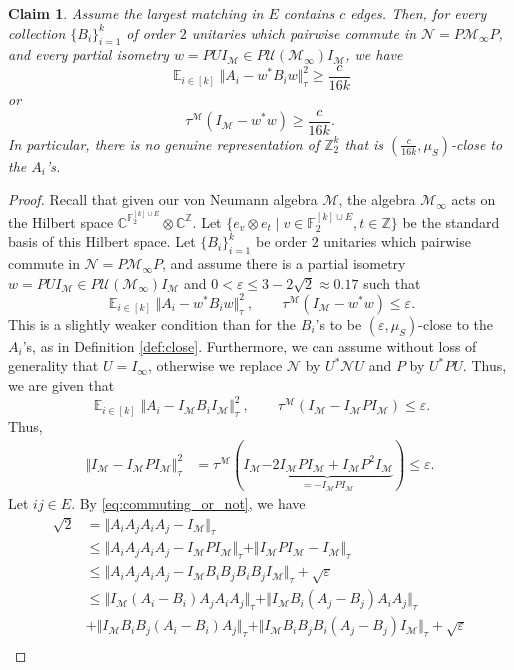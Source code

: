 \documentclass[11pt]{article}
\newtheorem{claim}[theorem]{Claim}
\theoremstyle{definition}
\newcommand{\Id}{\ensuremath{I}}
\DeclareMathOperator*{\Expectation}{\mathbb{E}}
\newcommand{\field}{\mathbb{F}_2}
\newcommand{\complex}{\ensuremath{\mathbb{C}}}
\newcommand{\Z}{\ensuremath{\mathbb{Z}}}
\newcommand{\mM}{\ensuremath{\mathcal{M}}}
\newcommand{\mU}{\ensuremath{\mathcal{U}}}
\newcommand{\eps}{\varepsilon}
\newcommand{\mN}{\mathcal{N}}
\begin{document}
\begin{claim}
Assume the largest matching in $E$ contains $c$ edges. Then, for every collection $\{B_i\}_{i=1}^k$ of order $2$ unitaries which pairwise commute in $\mN=P\mM_\infty P$, and  every partial isometry $w=PU\Id_\mM\in P\mU(\mM_\infty)\Id_\mM$, we have
\[
\Expectation_{i\in [k]} \Vert A_i-w^* B_iw\Vert_\tau^2 \geq  \frac{c}{16k} 
\]
or 
\[
\tau^\mM(\Id_\mM-w^*w)\geq  \frac{c}{16k}.
\]
In particular, there is no genuine representation of $\Z_2^k$ that is $(\frac{c}{16k},\mu_S)$-close to the $A_i$'s.
\end{claim}
\begin{proof}
Recall that given our von Neumann algebra $\mM$, the algebra $\mM_\infty$ acts on the Hilbert space $\complex^{\field^{[k]\cup E}}\otimes \complex^\Z$. Let $\{e_v\otimes e_t\mid v\in \field^{[k]\cup E},t\in \Z\}$ be the standard basis of this Hilbert space.
Let $\{B_i\}_{i=1}^k$ be order $2$ unitaries which pairwise commute in $\mN=P\mM_\infty P $, and assume  there is a partial isometry $w=PU\Id_\mM\in P\mU(\mM_\infty)\Id_\mM$ and  $0<\eps\leq 3-2\sqrt{2}\approx 0.17$ such that 
\[
\Expectation_{i\in [k]} \Vert A_i-w^* B_iw\Vert_\tau^2\ ,\qquad  \tau^\mM(\Id_\mM-w^*w)\leq  \eps.
\]
This is a slightly weaker condition than for the $B_i$'s to be $(\eps,\mu_S)$-close to the $A_i$'s, as in Definition \ref{def:close}. Furthermore, we can assume without loss of generality that $U=\Id_\infty$, otherwise we replace $\mN$ by $U^*\mN U$ and $P$ by $U^* PU$. Thus, we are given that 
\[
\Expectation_{i\in [k]} \Vert A_i-\Id_\mM  B_i\Id_\mM\Vert_\tau^2\ ,\qquad  \tau^\mM(\Id_\mM-\Id_\mM P\Id_\mM)\leq  \eps.
\]
Thus, 
\[
\begin{split}
    \Vert \Id_\mM-\Id_\mM P\Id_\mM\Vert_\tau^2 &=\tau^{\mM}(\Id_\mM\underbrace{-2\Id_\mM P\Id_\mM+\Id_\mM P^2\Id_\mM}_{=-\Id_\mM P\Id_\mM})\leq \eps.
\end{split}
\]
Let $ij\in E$. By \eqref{eq:commuting_or_not}, we have
\begin{align*}
    \sqrt{2}&=\Vert A_iA_jA_iA_j-\Id_\mM\Vert_\tau\\
    &\leq \Vert A_iA_jA_iA_j-\Id_\mM P\Id_\mM\Vert_\tau+\Vert \Id_\mM P\Id_\mM-\Id_\mM\Vert_\tau\\
    &\leq \Vert A_iA_jA_iA_j-\Id_\mM B_iB_jB_iB_j\Id_\mM\Vert_\tau+\sqrt\eps\\
    &\leq \Vert \Id_\mM(A_i-B_i)A_jA_iA_j\Vert_\tau+\Vert \Id_\mM B_i(A_j-B_j)A_iA_j\Vert_\tau\\
    &+\Vert \Id_\mM B_iB_j(A_i-B_i)A_j\Vert_\tau+\Vert \Id_\mM B_iB_jB_i(A_j-B_j)\Id_\mM\Vert_\tau+\sqrt\eps\\

\end{align*}
\end{proof}
\end{document}
